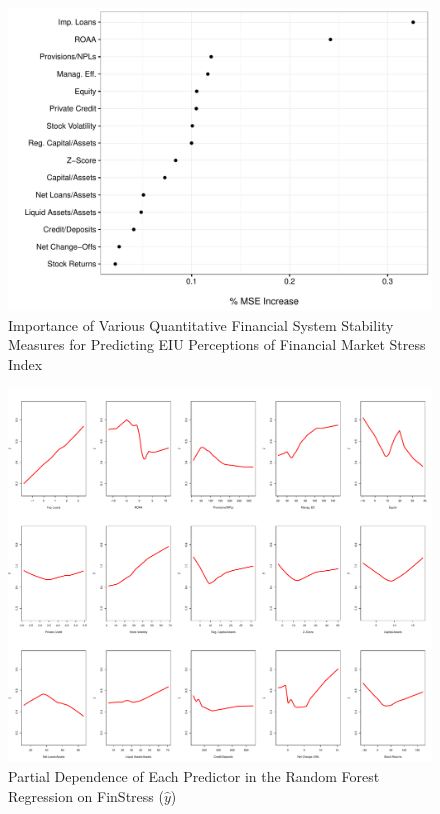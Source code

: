 \documentclass[]{article}
\begin{document}
\begin{figure}
    \caption{Importance of Various Quantitative Financial System Stability Measures for Predicting EIU Perceptions of Financial Market Stress Index}
    \label{rf_var_importance}
    \begin{center}
        \includegraphics[scale=0.5]{figures/rf_variable_imp.pdf}
    \end{center}
\end{figure}

\begin{landscape}
\begin{figure}
    \caption{Partial Dependence of Each Predictor in the Random Forest Regression on FinStress ($\hat{y}$)}
    \label{rf_partial_depend}
    \begin{center}
        \includegraphics[scale=0.42]{figures/rf_partial_dependence.pdf}
    \end{center}

\end{figure}
\end{landscape}
\end{document}
